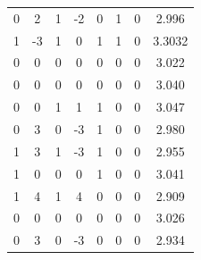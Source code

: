 \documentclass[a4paper, 12pt]{article}
\begin{document}
\begin{table}[H]
\begin{tabular}{@{}cccccccc@{}}
    0                      & 2                      & 1                      & -2                     & 0                 & 1                 & 0                 & 2.996               \\
    1                      & -3                     & 1                      & 0                      & 1                 & 1                 & 0                 & 3.3032              \\
    0                      & 0                      & 0                      & 0                      & 0                 & 0                 & 0                 & 3.022               \\
    0                      & 0                      & 0                      & 0                      & 0                 & 0                 & 0                 & 3.040               \\
    0                      & 0                      & 1                      & 1                      & 1                 & 0                 & 0                 & 3.047               \\
    0                      & 3                      & 0                      & -3                     & 1                 & 0                 & 0                 & 2.980               \\
    1                      & 3                      & 1                      & -3                     & 1                 & 0                 & 0                 & 2.955               \\
    1                      & 0                      & 0                      & 0                      & 1                 & 0                 & 0                 & 3.041               \\
    1                      & 4                      & 1                      & 4                      & 0                 & 0                 & 0                 & 2.909               \\
    0                      & 0                      & 0                      & 0                      & 0                 & 0                 & 0                 & 3.026               \\
    0                      & 3                      & 0                      & -3                     & 0                 & 0                 & 0                 & 2.934               \\ \bottomrule
    \end{tabular}
    \end{table}
\end{document}
